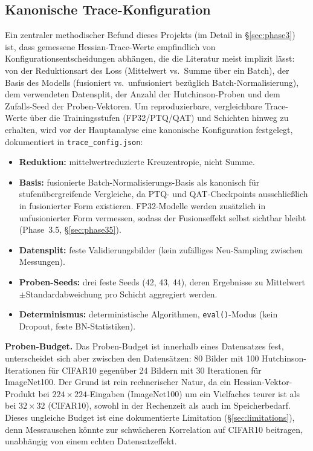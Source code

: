 \subsection{Kanonische Trace-Konfiguration}
\label{sec:canonical-config}

Ein zentraler methodischer Befund dieses Projekts (im Detail in \S\ref{sec:phase3}) ist, dass gemessene Hessian-Trace-Werte empfindlich von Konfigurationsentscheidungen abhängen, die die Literatur meist implizit lässt: von der Reduktionsart des Loss (Mittelwert vs.\ Summe über ein Batch), der Basis des Modells (fusioniert vs.\ unfusioniert bezüglich Batch-Normalisierung), dem verwendeten Datensplit, der Anzahl der Hutchinson-Proben und dem Zufalls-Seed der Proben-Vektoren. Um reproduzierbare, vergleichbare Trace-Werte über die Trainingsstufen (FP32/PTQ/QAT) und Schichten hinweg zu erhalten, wird vor der Hauptanalyse eine kanonische Konfiguration festgelegt, dokumentiert in \texttt{trace\_config.json}:

\begin{itemize}
\item \textbf{Reduktion:} mittelwertreduzierte Kreuzentropie, nicht Summe.
\item \textbf{Basis:} fusionierte Batch-Normalisierungs-Basis \citep{ioffe_batchnorm_2015} als kanonisch für stufenübergreifende Vergleiche, da PTQ- und QAT-Checkpoints ausschließlich in fusionierter Form existieren. FP32-Modelle werden zusätzlich in unfusionierter Form vermessen, sodass der Fusionseffekt selbst sichtbar bleibt (Phase~3.5, \S\ref{sec:phase35}).
\item \textbf{Datensplit:} feste Validierungsbilder (kein zufälliges Neu-Sampling zwischen Messungen).
\item \textbf{Proben-Seeds:} drei feste Seeds (42, 43, 44), deren Ergebnisse zu Mittelwert$\pm$Standardabweichung pro Schicht aggregiert werden.
\item \textbf{Determinismus:} deterministische Algorithmen, \texttt{eval()}-Modus (kein Dropout, feste BN-Statistiken).
\end{itemize}

\textbf{Proben-Budget.} Das Proben-Budget ist innerhalb eines Datensatzes fest, unterscheidet sich aber zwischen den Datensätzen: 80 Bilder mit 100 Hutchinson-Iterationen für CIFAR10 gegenüber 24 Bildern mit 30 Iterationen für ImageNet100. Der Grund ist rein rechnerischer Natur, da ein Hessian-Vektor-Produkt bei $224\times224$-Eingaben (ImageNet100) um ein Vielfaches teurer ist als bei $32\times32$ (CIFAR10), sowohl in der Rechenzeit als auch im Speicherbedarf. Dieses ungleiche Budget ist eine dokumentierte Limitation (\S\ref{sec:limitations}), denn Messrauschen könnte zur schwächeren Korrelation auf CIFAR10 beitragen, unabhängig von einem echten Datensatzeffekt.
\par\medskip

